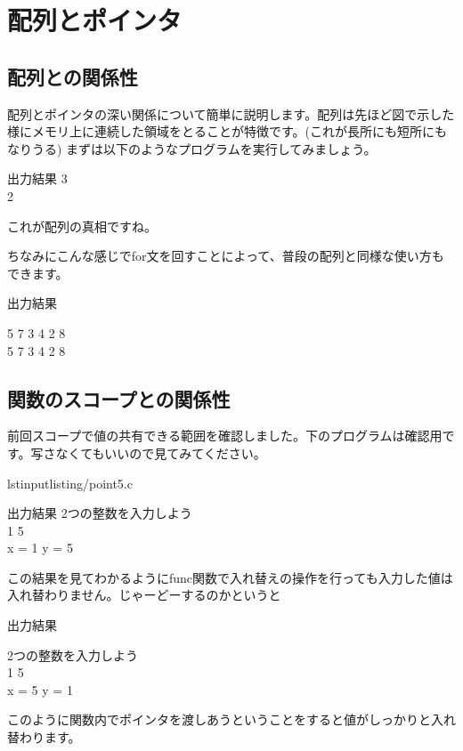 \section{配列とポインタ}

\subsection{配列との関係性}
配列とポインタの深い関係について簡単に説明します。配列は先ほど図で示した様にメモリ上に連続した領域をとることが特徴です。(これが長所にも短所にもなりうる)
まずは以下のようなプログラムを実行してみましょう。



\begin{itembox}{出力結果}
3\\
2

\end{itembox}
これが配列の真相ですね。

ちなみにこんな感じでfor文を回すことによって、普段の配列と同様な使い方もできます。


\begin{itembox}{出力結果}

5 7 3 4 2 8\\
5 7 3 4 2 8
\end{itembox}

\subsection{関数のスコープとの関係性}
前回スコープで値の共有できる範囲を確認しました。下のプログラムは確認用です。写さなくてもいいので見てみてください。

lstinputlisting{\codepath/point5.c}

\begin{itembox}{出力結果}
2つの整数を入力しよう\\
1 5\\
x = 1 y = 5

\end{itembox}
この結果を見てわかるようにfunc関数で入れ替えの操作を行っても入力した値は入れ替わりません。じゃーどーするのかというと



\begin{itembox}{出力結果}

2つの整数を入力しよう\\
1 5\\
x = 5 y = 1
\end{itembox}
このように関数内でポインタを渡しあうということをすると値がしっかりと入れ替わります。

